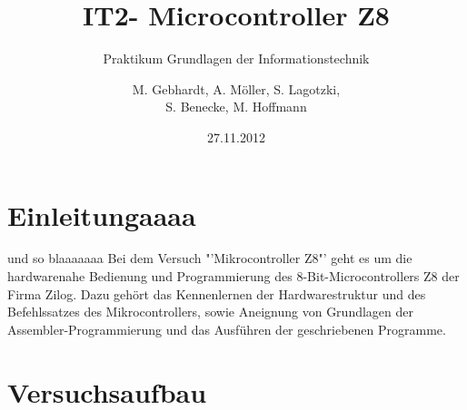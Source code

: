 
\usepackage{paralist} %
\usepackage{circuitikz} %
\usepackage{picins}
\usepackage{wasysym}
\usepackage{pict2e}
\usepackage{lscape}
\usepackage{soul}
\usepackage[right]{eurosym}
\usepackage{array}
\usepackage{multirow}
\usepackage{tikz}
\usetikzlibrary{shapes,arrows}
\title{IT2- Microcontroller Z8}
\subtitle{Praktikum Grundlagen der Informationstechnik}
\author{M. Gebhardt, A. Möller, S. Lagotzki,\\S. Benecke, M. Hoffmann}
\date{27.11.2012}
\publishers{Marc.Gebhardt@st.ovgu.de}

\maketitle
{}
\begingroup
  \pagestyle{empty}
  \tableofcontents
  \newpage
\endgroup  
\setcounter{page}{1}


\section{Einleitungaaaa}

und so blaaaaaaa
Bei dem Versuch "'Mikrocontroller Z8"' geht es um die hardwarenahe Bedienung und Programmierung des 8-Bit-Microcontrollers Z8 der Firma Zilog. Dazu gehört das Kennenlernen der Hardwarestruktur und des Befehlssatzes des Mikrocontrollers, sowie Aneignung von Grundlagen der Assembler-Programmierung und das Ausführen der geschriebenen Programme. 

\section{Versuchsaufbau}

